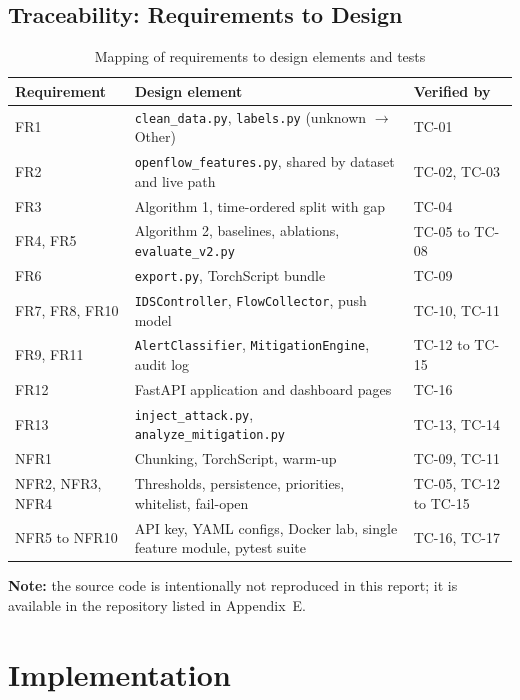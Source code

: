\section{Traceability: Requirements to Design}

\begin{table}[htbp]
\centering
\caption{Mapping of requirements to design elements and tests}
\label{tab:trace}
\small
\begin{tabularx}{\textwidth}{|p{2cm}|X|p{3.4cm}|}
\hline
\textbf{Requirement} & \textbf{Design element} & \textbf{Verified by} \\ \hline
FR1 & \texttt{clean\_data.py}, \texttt{labels.py} (unknown $\to$ Other) & TC-01 \\ \hline
FR2 & \texttt{openflow\_features.py}, shared by dataset and live path & TC-02, TC-03 \\ \hline
FR3 & Algorithm 1, time-ordered split with gap & TC-04 \\ \hline
FR4, FR5 & Algorithm 2, baselines, ablations, \texttt{evaluate\_v2.py} & TC-05 to TC-08 \\ \hline
FR6 & \texttt{export.py}, TorchScript bundle & TC-09 \\ \hline
FR7, FR8, FR10 & \texttt{IDSController}, \texttt{FlowCollector}, push model & TC-10, TC-11 \\ \hline
FR9, FR11 & \texttt{AlertClassifier}, \texttt{MitigationEngine}, audit log & TC-12 to TC-15 \\ \hline
FR12 & FastAPI application and dashboard pages & TC-16 \\ \hline
FR13 & \texttt{inject\_attack.py}, \texttt{analyze\_mitigation.py} & TC-13, TC-14 \\ \hline
NFR1 & Chunking, TorchScript, warm-up & TC-09, TC-11 \\ \hline
NFR2, NFR3, NFR4 & Thresholds, persistence, priorities, whitelist, fail-open & TC-05, TC-12 to TC-15 \\ \hline
NFR5 to NFR10 & API key, YAML configs, Docker lab, single feature module, pytest suite & TC-16, TC-17 \\ \hline
\end{tabularx}
\end{table}

\textbf{Note:} the source code is intentionally not reproduced in this report; it is available in the repository listed in Appendix~E.



\chapter{Implementation}

